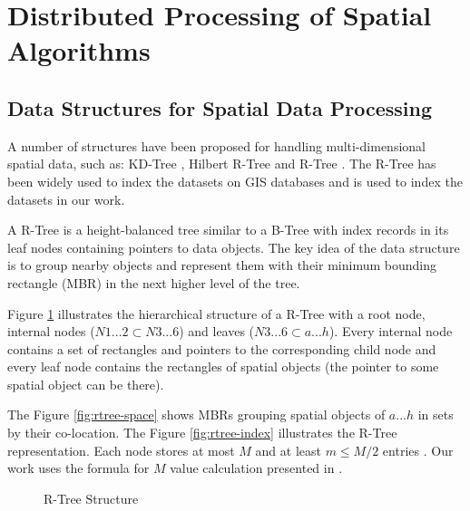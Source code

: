 \section{Distributed Processing of Spatial Algorithms}
\label{sec:spatial_dist}

\subsection{Data Structures for Spatial Data Processing}
\label{sub:spatialdata}		
A number of structures have been proposed for handling multi-dimensional spatial data, such as: 
KD-Tree \cite{bentley1975multidimensional}, Hilbert R-Tree \cite{kamel1994hilbert} and R-Tree \cite{guttman1984r}.
The R-Tree has been widely used to index the datasets on GIS databases and is used to index the datasets in our work.

A R-Tree is a height-balanced tree similar to a B-Tree \cite{comer1979ubiquitous} with index records in its leaf nodes containing pointers to data objects. 
The key idea of the data structure is to group nearby objects and represent them with their minimum bounding rectangle (MBR) in the next higher level of the tree. 

Figure \ref{fig:rtree} illustrates the hierarchical structure of a R-Tree with a root node, internal nodes ($N1...2 \subset N3...6$) and leaves ($N3...6 \subset a...h$). 
Every internal node contains a set of rectangles and pointers to the corresponding child node and every leaf node contains the rectangles of spatial objects 
(the pointer to some spatial object can be there). 

The Figure \ref{fig:rtree-space} shows MBRs grouping spatial objects of $a...h$ in sets by their co-location. 
The Figure \ref{fig:rtree-index} illustrates the R-Tree representation. Each node stores at most $M$ and at least $m \leq M/2$ entries \cite{guttman1984r}. 
Our work uses the formula for $M$ value calculation presented in \cite{dedsi}.

\begin{figure}[h]
  \centering
   \qquad
  \caption{R-Tree Structure}
  \label{fig:rtree}
\end{figure}

